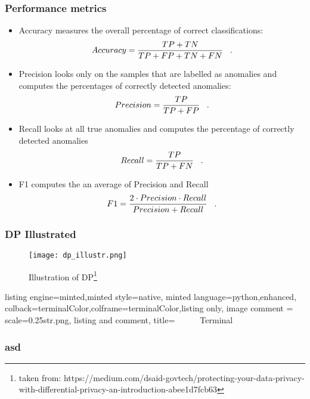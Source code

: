 \begin{frame}
    \frametitle{Performance metrics}
    \begin{itemize}
        \item Accuracy measures the overall percentage of correct classifications:
        \begin{align}
            Accuracy = \frac{TP+TN}{TP+FP+TN+FN} \;\;\;.
        \end{align}
        \item Precision looks only on the samples that are labelled as anomalies and computes the percentages of correctly detected anomalies:
        \begin{align}
            Precision = \frac{TP}{TP+FP} \;\;\;.
        \end{align}
        \item Recall looks at all true anomalies and computes the percentage of correctly detected anomalies
        \begin{align}
            Recall = \frac{TP}{TP+FN} \;\;\;.
        \end{align}
        \item F1 computes the an average of Precision and Recall
        \begin{align}
            F1 = \frac{2\cdot Precision\cdot Recall}{Precision + Recall} \;\;\;.
        \end{align}
    \end{itemize}
    

\end{frame}

\begin{frame}
    \frametitle{DP Illustrated}

    \begin{figure}[h]
        \centering
        \texttt{[image: dp\_illustr.png]}
        \caption{Illustration of DP\footnote{taken from: https://medium.com/dsaid-govtech/protecting-your-data-privacy-with-differential-privacy-an-introduction-abee1d7fcb63}}
        \label{fig:enter-label}
    \end{figure}

\end{frame}


\begin{frame}[fragile]
    \begin{tcblisting}{listing engine=minted,minted style=native,
        minted language=python,enhanced,
        colback=terminalColor,colframe=terminalColor,listing only, 
        image comment = {scale=0.25}{str.png},
        listing and comment,
        title=~~~~~~Terminal}
    \end{tcblisting}
\end{frame}

\begin{frame}[fragile]
    \frametitle{asd}

   

\end{frame}